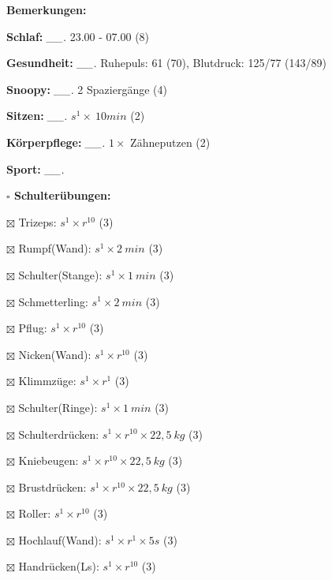 \documentclass[10pt,a4paper]{article}
\newcommand\prop[1] {{\color {alizarin} {\bf #1}}}             %
\newcommand\mand[1] {{\color {burntorange} {\bf #1}}}          %
\newcommand\topspace{\vskip -15pt \hskip 20pt}
\newcommand\n[1] { {\sl #1.} \hskip 5pt }
\begin{document}
\begin{mdframed}[style=daystyle]
  \begin{labeling}{{\mand {Bemerkungen:}}}
    \setlength\itemsep{-3pt}
  \item[{\mand {Schlaf:}}]        \n{\_\_} 23.00 - 07.00 (8)
  \item[{\mand {Gesundheit:}}]    \n{\_\_} Ruhepuls: 61 (70), Blutdruck: 125/77 (143/89)
  \item[{\mand {Snoopy:}}]        \n{\_\_} 2 Spaziergänge (4)  
  \item[{\mand {Sitzen:}}]        \n{\_\_} $s^1 \times\ 10 min$ (2)
  \item[{\mand {Körperpflege:}}]  \n{\_\_} $1 \times$ Zähneputzen (2)
  \item[{\mand {Sport:}}]         \n{\_\_}
    \topspace
    \begin{minipage}{0.75\textwidth}  
      \begin{labeling}{\prop {$\square$ {Schulterübungen:}}} 
        \setlength\itemsep{-3pt}
      \item[$\boxtimes$ Trizeps:]          $s^1 \times r^{10}$ (3)
      \item[$\boxtimes$ Rumpf(Wand):]      $s^1 \times 2\ min$ (3)
      \item[$\boxtimes$ Schulter(Stange):] $s^1 \times 1\ min$ (3)
      \item[$\boxtimes$ Schmetterling:]    $s^1 \times 2\ min$ (3)
      \item[$\boxtimes$ Pflug:]            $s^1 \times r^{10}$ (3)
      \item[$\boxtimes$ Nicken(Wand):]     $s^1 \times r^{10}$ (3)
      \item[$\boxtimes$ Klimmzüge:]        $s^1 \times r^1$ (3)
      \item[$\boxtimes$ Schulter(Ringe):]  $s^1 \times 1\ min$ (3)
      \item[$\boxtimes$ Schulterdrücken:]  $s^1 \times r^{10} \times 22,5\ kg$ (3)
      \item[$\boxtimes$ Kniebeugen:]       $s^1 \times r^{10} \times 22,5\ kg$ (3)
      \item[$\boxtimes$ Brustdrücken:]     $s^1 \times r^{10} \times 22,5\ kg$ (3)
      \item[$\boxtimes$ Roller:]           $s^1 \times r^{10}$ (3)
      \item[$\boxtimes$ Hochlauf(Wand):]   $s^1 \times r^{1} \times 5s$ (3)
      \item[$\boxtimes$ Handrücken(Ls):]   $s^1 \times r^{10}$ (3)

\end{labeling}
\end{minipage}
\end{labeling}
\end{mdframed}
\end{document}
